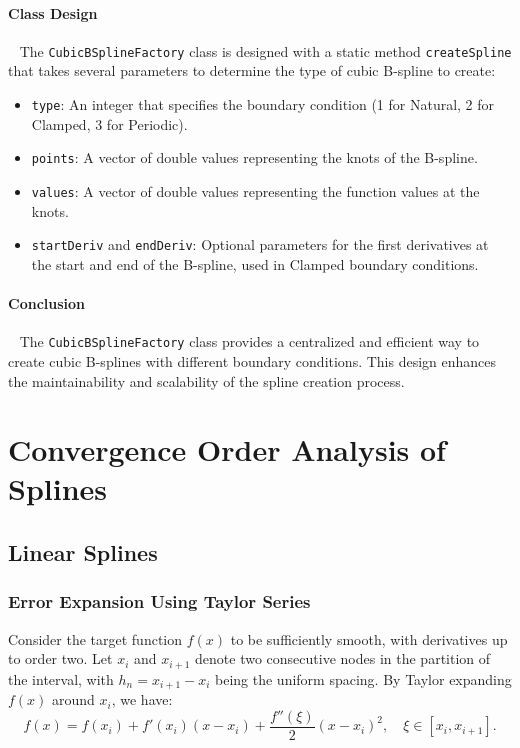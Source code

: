 \documentclass{article}
\begin{document}
\paragraph{\textbf{Class Design}}~{} \newline
The \texttt{CubicBSplineFactory} class is designed with a static method \texttt{createSpline} that takes several parameters to determine the type of cubic B-spline to create:
\begin{itemize}
    \item \texttt{type}: An integer that specifies the boundary condition (1 for Natural, 2 for Clamped, 3 for Periodic).
    \item \texttt{points}: A vector of double values representing the knots of the B-spline.
    \item \texttt{values}: A vector of double values representing the function values at the knots.
    \item \texttt{startDeriv} and \texttt{endDeriv}: Optional parameters for the first derivatives at the start and end of the B-spline, used in Clamped boundary conditions.
\end{itemize}

\paragraph{\textbf{Conclusion}}~{} \newline
The \texttt{CubicBSplineFactory} class provides a centralized and efficient way to create cubic B-splines with different boundary conditions. This design enhances the maintainability and scalability of the spline creation process.



\section{Convergence Order Analysis of Splines}

\subsection{Linear Splines}

\subsubsection{Error Expansion Using Taylor Series}
Consider the target function $f(x)$ to be sufficiently smooth, with derivatives up to order two. Let $x_i$ and $x_{i+1}$ denote two consecutive nodes in the partition of the interval, with $h_n = x_{i+1} - x_i$ being the uniform spacing. By Taylor expanding $f(x)$ around $x_i$, we have:
\[
f(x) = f(x_i) + f'(x_i)(x - x_i) + \frac{f''(\xi)}{2}(x - x_i)^2, \quad \xi \in [x_i, x_{i+1}].
\]
\end{document}
